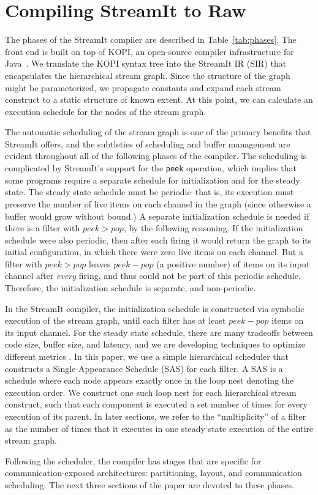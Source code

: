 \section{Compiling StreamIt to Raw}
\label{sec:phases}

The phases of the StreamIt compiler are described in
Table~\ref{tab:phases}.  The front end is built on top of KOPI, an
open-source compiler infrastructure for Java~\cite{kopi}.  We
translate the KOPI syntax tree into the StreamIt IR (SIR) that
encapsulates the hierarchical stream graph.  Since the structure of
the graph might be parameterized, we propagate constants and expand
each stream construct to a static structure of known extent.  At this
point, we can calculate an execution schedule for the nodes of the
stream graph.

The automatic scheduling of the stream graph is one of the primary
benefits that StreamIt offers, and the subtleties of scheduling and
buffer management are evident throughout all of the following phases
of the compiler.  The scheduling is complicated by StreamIt's support
for the {\tt peek} operation, which implies that some programs require
a separate schedule for initialization and for the steady state.  The
steady state schedule must be periodic--that is, its execution must
preserve the number of live items on each channel in the graph (since
otherwise a buffer would grow without bound.)  A separate
initialization schedule is needed if there is a filter with $peek >
pop$, by the following reasoning.  If the initialization schedule were
also periodic, then after each firing it would return the graph to its
initial configuration, in which there were zero live items on each
channel.  But a filter with $peek > pop$ leaves $peek-pop$ (a positive
number) of items on its input channel after {\it every} firing, and
thus could not be part of this periodic schedule.  Therefore, the
initialization schedule is separate, and non-periodic.

In the StreamIt compiler, the initialization schedule is constructed
via symbolic execution of the stream graph, until each filter has at
least $peek-pop$ items on its input channel.  For the steady state
schedule, there are many tradeoffs between code size, buffer size, and
latency, and we are developing techniques to optimize different
metrics \cite{streamittech2}.  In this paper, we use a simple
hierarchical scheduler that constructs a Single Appearance Schedule
(SAS) \cite{leesdf} for each filter.  A SAS is a schedule where each
node appears exactly once in the loop nest denoting the execution
order.  We construct one such loop nest for each hierarchical stream
construct, such that each component is executed a set number of times
for every execution of its parent.  In later sections, we refer to the
``multiplicity'' of a filter as the number of times that it executes
in one steady state execution of the entire stream graph.

Following the scheduler, the compiler has stages that are specific for
communication-exposed architectures: partitioning, layout, and
communication scheduling.  The next three sections of the paper are
devoted to these phases.